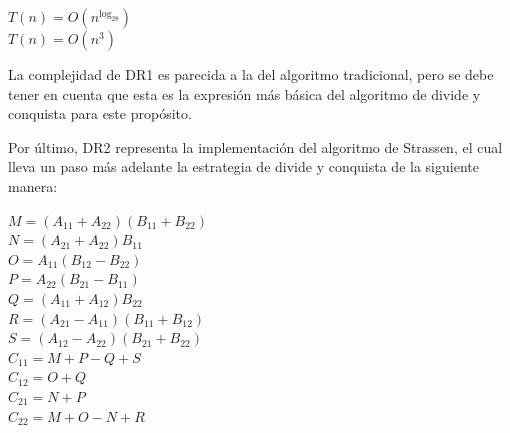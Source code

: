 \documentclass[12pt]{report}
\begin{document}
  \begin{center}
    $ T(n) = O(n^{\log_28}) $ \\
    $ T(n) = O(n^3) $
  \end{center}
  
  La complejidad de DR1 es parecida a la del algoritmo tradicional, pero se debe tener en cuenta que esta es la expresión más básica del algoritmo de divide y conquista para este propósito.
  
  \begin{center}
  \end{center}
    
  Por último, DR2 representa la implementación del algoritmo de Strassen, el cual lleva un paso más adelante la estrategia de divide y conquista de la siguiente manera:
  
  \begin{center}
    $ M = (A_{11} + A_{22})(B_{11} + B_{22}) $ \\
    $ N = (A_{21} + A_{22})B_{11} $ \\
    $ O = A_{11}(B_{12} - B_{22}) $ \\
    $ P = A_{22}(B_{21} - B_{11}) $ \\
    $ Q = (A_{11} + A_{12})B_{22} $ \\
    $ R = (A_{21} - A_{11})(B_{11} + B_{12}) $\\
    $ S = (A_{12} - A_{22})(B_{21} + B_{22}) $ \\
    $ C_{11} = M + P - Q + S $ \\
    $ C_{12} = O + Q $ \\
    $ C_{21} = N + P $ \\
    $ C_{22} = M + O - N + R $
  \end{center}
  
\end{document}
